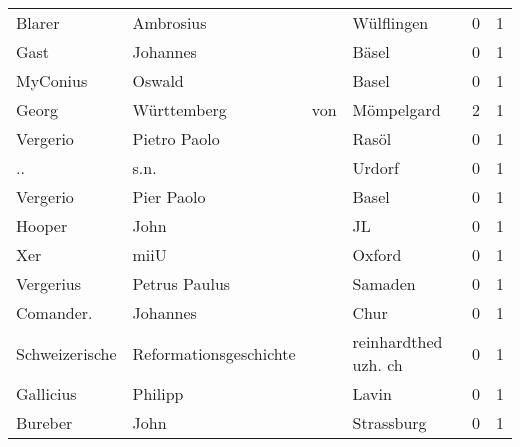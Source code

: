 \begin{center}
\begin{tiny}
\begin{longtabu}{llllrr}
                   Blarer &                          Ambrosius &             &                                  Wülflingen &          0 &         1 \\
                     Gast &                           Johannes &             &                                       Bäsel &          0 &         1 \\
                 MyConius &                             Oswald &             &                                       Basel &          0 &         1 \\
                    Georg &                        Württemberg &         von &                                  Mömpelgard &          2 &         1 \\
                 Vergerio &                       Pietro Paolo &             &                                       Rasöl &          0 &         1 \\
                       .. &                               s.n. &             &                                      Urdorf &          0 &         1 \\
                 Vergerio &                         Pier Paolo &             &                                       Basel &          0 &         1 \\
                   Hooper &                               John &             &                                          JL &          0 &         1 \\
                      Xer &                               miiU &             &                                      Oxford &          0 &         1 \\
                Vergerius &                      Petrus Paulus &             &                                     Samaden &          0 &         1 \\
                Comander. &                           Johannes &             &                                        Chur &          0 &         1 \\
           Schweizerische &             Reformationsgeschichte &             &                        reinhardthed uzh. ch &          0 &         1 \\
                Gallicius &                            Philipp &             &                                       Lavin &          0 &         1 \\
                  Bureber &                               John &             &                                  Strassburg &          0 &         1 \\

\end{longtabu}
\end{tiny}
\end{center}
